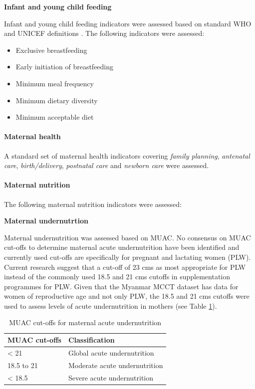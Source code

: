 \documentclass[12pt,a4paper]{article}
\let\oldparagraph\paragraph
\renewcommand{\paragraph}[1]{\oldparagraph{#1}\mbox{}}
\begin{document}
\textbf{Infant and young child feeding}

Infant and young child feeding indicators were assessed based on standard WHO and UNICEF definitions \citep{WorldHealthOrganization:2008vw}. The following indicators were assessed:

\begin{itemize}
\item
  Exclusive breastfeeding
\item
  Early initiation of breastfeeding
\item
  Minimum meal frequency
\item
  Minimum dietary diversity
\item
  Minimum acceptable diet
\end{itemize}

\hypertarget{mhealth}{%
\paragraph{Maternal health}\label{mhealth}}

A standard set of maternal health indicators covering \emph{family planning}, \emph{antenatal care}, \emph{birth/delivery}, \emph{postnatal care} and \emph{newborn care} were assessed.

\hypertarget{mnut}{%
\paragraph{Maternal nutrition}\label{mnut}}

The following maternal nutrition indicators were assessed:

\textbf{Maternal undernutrtion}

Maternal undernutrition was assessed based on MUAC. No consensus on MUAC cut-offs to determine maternal acute undernutrition have been identified and currently used cut-offs are specifically for pregnant and lactating women (PLW). Current research suggest that a cut-off of 23 cms as most appropriate for PLW \citep{Ververs:2013ee} instead of the commonly used 18.5 and 21 cms cutoffs in supplementation programmes for PLW. Given that the Myanmar MCCT dataset has data for women of reproductive age and not only PLW, the 18.5 and 21 cms cutoffs were used to assess levels of acute undernutrition in mothers (see Table \ref{tab:manthro1}).

\begin{table}[H]

\caption{\label{tab:manthro1}MUAC cut-offs for maternal acute undernutrition}
\centering
\begin{tabular}[t]{ll}
\toprule
\textbf{MUAC cut-offs} & \textbf{Classification}\\
\midrule
\rowcolor{gray!6}  < 21 & Global acute undernutrition\\
18.5 to 21 & Moderate acute undernutrition\\
\rowcolor{gray!6}  < 18.5 & Severe acute undernutrition\\
\bottomrule
\end{tabular}
\end{table}
\end{document}
